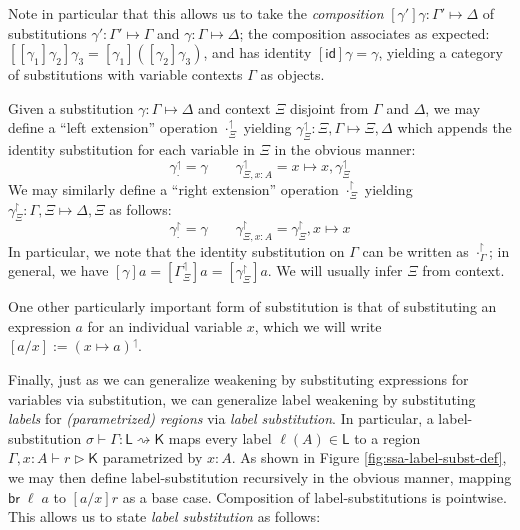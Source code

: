 \documentclass[acmsmall,screen,review]{acmart}
\newcommand{\ms}[1]{\ensuremath{\mathsf{#1}}}
\newcommand{\rupg}[1]{{#1}^\upharpoonright}
\newcommand{\lupg}[1]{{#1}^\upharpoonleft}
\newcommand{\bhyp}[2]{#1 : #2}
\newcommand{\haslb}[3]{#1 \vdash #2 \rhd #3}
\newcommand{\issubst}[3]{#1: #2 \mapsto #3}
\newcommand{\lbsubst}[4]{#1 \vdash #2: #3 \rightsquigarrow #4}
\begin{document}
Note in particular that this allows us to take the \emph{composition}
$\issubst{[\gamma']\gamma}{\Gamma'}{\Delta}$ of substitutions $\issubst{\gamma'}{\Gamma'}{\Gamma}$
and $\issubst{\gamma}{\Gamma}{\Delta}$; the composition associates as expected:
$[[\gamma_1]\gamma_2]\gamma_3 = [\gamma_1]([\gamma_2]\gamma_3)$, and has identity $[\ms{id}]\gamma =
\gamma$, yielding a category of substitutions with variable contexts $\Gamma$ as objects.

Given a substitution $\issubst{\gamma}{\Gamma}{\Delta}$ and context $\Xi$ disjoint from $\Gamma$ and
$\Delta$, we may define a ``left extension'' operation $\lupg{\cdot}_\Xi$ yielding
$\issubst{\lupg{\gamma}_{\Xi}}{\Xi, \Gamma}{\Xi, \Delta}$ which appends the identity substitution
for each variable in $\Xi$ in the obvious manner:
\begin{equation}
  \lupg{\gamma}_{\cdot} = \gamma \qquad 
  \lupg{\gamma}_{\Xi, \bhyp{x}{A}} = x \mapsto x, \lupg{\gamma}_{\Xi}
\end{equation}
We may similarly define a ``right extension'' operation $\rupg{\cdot}_\Xi$ yielding
$\issubst{\rupg{\gamma}_{\Xi}}{\Gamma, \Xi}{\Delta, \Xi}$ as follows:
\begin{equation}
  \rupg{\gamma}_{\cdot} = \gamma \qquad 
  \rupg{\gamma}_{\Xi, \bhyp{x}{A}} = \rupg{\gamma}_{\Xi}, x \mapsto x
\end{equation}
In particular, we note that the identity substitution on $\Gamma$ can be written as
$\rupg{\cdot}_{\Gamma}$; in general, we have $[\gamma]a = [\lupg{\Gamma}_\Xi]a =
[\rupg{\gamma}_\Xi]a$. We will usually infer $\Xi$ from context.

One other particularly important form of substitution is that of substituting an expression $a$ for
an individual variable $x$, which we will write $[a/x] := \lupg{(x \mapsto a)}$.

Finally, just as we can generalize weakening by substituting expressions for variables via
substitution, we can generalize label weakening by substituting \emph{labels} for
\emph{(parametrized) regions} via \emph{label substitution}. In particular, a label-substitution
$\lbsubst{\sigma}{\Gamma}{\ms{L}}{\ms{K}}$ maps every label $\ell(A) \in \ms{L}$ to a region
$\haslb{\Gamma, x : A}{r}{\ms{K}}$ parametrized by $x : A$. As shown in Figure
\ref{fig:ssa-label-subst-def}, we may then define label-substitution recursively in the obvious
manner, mapping $\ms{br}\;\ell\;a$ to $[a/x]r$ as a base case. Composition of label-substitutions is
pointwise. This allows us to state \emph{label substitution} as follows:
\end{document}

